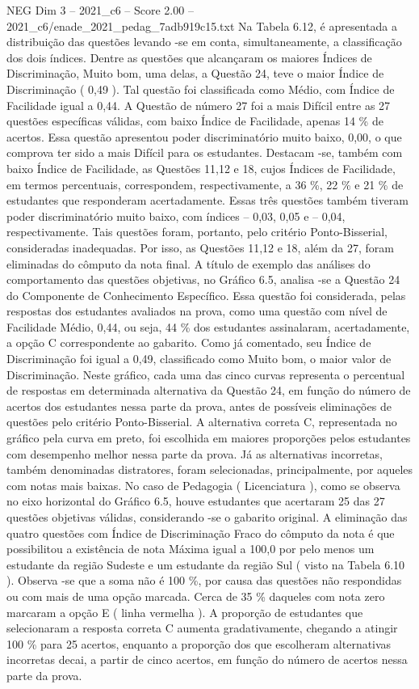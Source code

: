 \begin{textsample}{NEG Dim 3 – 2021\_c6 – Score 2.00 – 2021\_c6/enade\_2021\_pedag\_7adb919c15.txt}
Na Tabela 6.12, é apresentada a distribuição das questões levando -se em conta, simultaneamente, a classificação dos dois índices.
Dentre as questões que alcançaram os maiores Índices de Discriminação, Muito bom, uma delas, a Questão 24, teve o maior Índice de Discriminação ( 0,49 ).
Tal questão foi classificada como Médio, com Índice de Facilidade igual a 0,44.
A Questão de número 27 foi a mais Difícil entre as 27 questões específicas válidas, com baixo Índice de Facilidade, apenas 14 \% de acertos.
Essa questão apresentou poder discriminatório muito baixo, 0,00, o que comprova ter sido a mais Difícil para os estudantes.
Destacam -se, também com baixo Índice de Facilidade, as Questões 11,12 e 18, cujos Índices de Facilidade, em termos percentuais, correspondem, respectivamente, a 36 \%, 22 \% e 21 \% de estudantes que responderam acertadamente.
Essas três questões também tiveram poder discriminatório muito baixo, com índices – 0,03, 0,05 e – 0,04, respectivamente.
Tais questões foram, portanto, pelo critério Ponto-Bisserial, consideradas inadequadas.
Por isso, as Questões 11,12 e 18, além da 27, foram eliminadas do cômputo da nota final.
A título de exemplo das análises do comportamento das questões objetivas, no Gráfico 6.5, analisa -se a Questão 24 do Componente de Conhecimento Específico.
Essa questão foi considerada, pelas respostas dos estudantes avaliados na prova, como uma questão com nível de Facilidade Médio, 0,44, ou seja, 44 \% dos estudantes assinalaram, acertadamente, a opção C correspondente ao gabarito.
Como já comentado, seu Índice de Discriminação foi igual a 0,49, classificado como Muito bom, o maior valor de Discriminação.
Neste gráfico, cada uma das cinco curvas representa o percentual de respostas em determinada alternativa da Questão 24, em função do número de acertos dos estudantes nessa parte da prova, antes de possíveis eliminações de questões pelo critério Ponto-Bisserial.
A alternativa correta C, representada no gráfico pela curva em preto, foi escolhida em maiores proporções pelos estudantes com desempenho melhor nessa parte da prova.
Já as alternativas incorretas, também denominadas distratores, foram selecionadas, principalmente, por aqueles com notas mais baixas.
No caso de Pedagogia ( Licenciatura ), como se observa no eixo horizontal do Gráfico 6.5, houve estudantes que acertaram 25 das 27 questões objetivas válidas, considerando -se o gabarito original.
A eliminação das quatro questões com Índice de Discriminação Fraco do cômputo da nota é que possibilitou a existência de nota Máxima igual a 100,0 por pelo menos um estudante da região Sudeste e um estudante da região Sul ( visto na Tabela 6.10 ).
Observa -se que a soma não é 100 \%, por causa das questões não respondidas ou com mais de uma opção marcada.
Cerca de 35 \% daqueles com nota zero marcaram a opção E ( linha vermelha ).
A proporção de estudantes que selecionaram a resposta correta C aumenta gradativamente, chegando a atingir 100 \% para 25 acertos, enquanto a proporção dos que escolheram alternativas incorretas decai, a partir de cinco acertos, em função do número de acertos nessa parte da prova.

\end{textsample}
